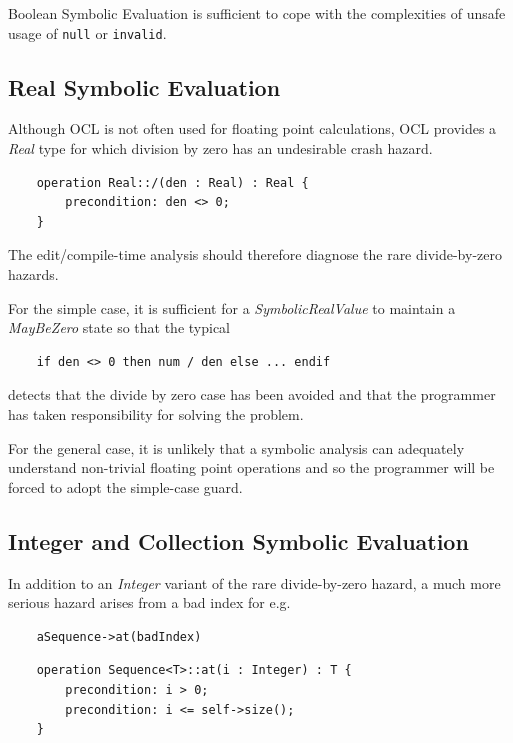 \documentclass{llncs}
\begin{document}
Boolean Symbolic Evaluation is sufficient to cope with the complexities of unsafe usage of \verb|null| or \verb|invalid|.

\subsection{Real Symbolic Evaluation}

Although OCL is not often used for floating point calculations, OCL provides a \emph{Real} type for which division by zero has an undesirable crash hazard.

\begin{verbatim}
	operation Real::/(den : Real) : Real {
		precondition: den <> 0;
	}
\end{verbatim}

The edit/compile-time analysis should therefore diagnose the rare divide-by-zero hazards.

For the simple case, it is sufficient for a \emph{SymbolicRealValue} to maintain a \emph{MayBeZero} state so that the typical

\begin{verbatim}
    if den <> 0 then num / den else ... endif
\end{verbatim}

detects that the divide by zero case has been avoided and that the programmer has taken responsibility for solving the problem.

For the general case, it is unlikely that a symbolic analysis can adequately understand non-trivial floating point operations and so the programmer will be forced to adopt the simple-case guard.

\subsection{Integer and Collection Symbolic Evaluation}

In addition to an \emph{Integer} variant of the rare divide-by-zero hazard, a much more serious hazard arises from a bad index for e.g.

\begin{verbatim}
    aSequence->at(badIndex)
\end{verbatim}

\begin{verbatim}
    operation Sequence<T>::at(i : Integer) : T {
        precondition: i > 0;
        precondition: i <= self->size();
    }
\end{verbatim}
\end{document}
